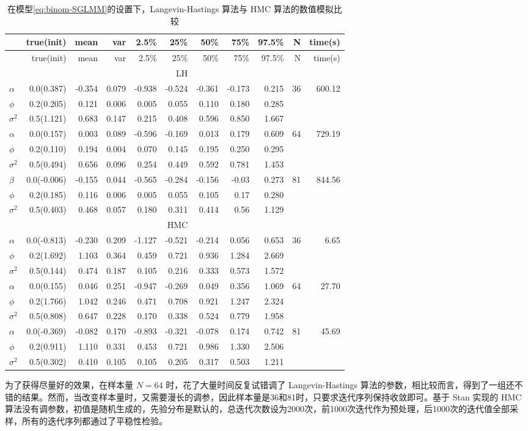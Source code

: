 \documentclass[12pt,a4paper,UTF8,twoside]{book}
\theoremstyle{definition}
\theoremstyle{definition}
\theoremstyle{definition}
\theoremstyle{remark}
\begin{document}
\begin{longtable}[]{@{}lrrrrrrrrrr@{}}
\caption{\label{tab:MCLH-vs-NUTS}
在模型\eqref{eq:binom-SGLMM}的设置下，Langevin-Hastings 算法与 HMC
算法的数值模拟比较}\tabularnewline
\toprule
& true(init) & mean & var & 2.5\% & 25\% & 50\% & 75\% & 97.5\% & N &
time(s)\tabularnewline
\midrule
\endfirsthead
\toprule
& true(init) & mean & var & 2.5\% & 25\% & 50\% & 75\% & 97.5\% & N &
time(s)\tabularnewline
\midrule
\endhead
& & & & & LH & & & & &\tabularnewline
\(\alpha\) & 0.0(0.387) & -0.354 & 0.079 & -0.938 & -0.524 & -0.361 &
-0.173 & 0.215 & 36 & 600.12\tabularnewline
\(\phi\) & 0.2(0.205) & 0.121 & 0.006 & 0.005 & 0.055 & 0.110 & 0.180 &
0.285 & &\tabularnewline
\(\sigma^2\) & 0.5(1.121) & 0.683 & 0.147 & 0.215 & 0.408 & 0.596 &
0.850 & 1.667 & &\tabularnewline
\(\alpha\) & 0.0(0.157) & 0.003 & 0.089 & -0.596 & -0.169 & 0.013 &
0.179 & 0.609 & 64 & 729.19\tabularnewline
\(\phi\) & 0.2(0.110) & 0.194 & 0.004 & 0.070 & 0.145 & 0.195 & 0.250 &
0.295 & &\tabularnewline
\(\sigma^2\) & 0.5(0.494) & 0.656 & 0.096 & 0.254 & 0.449 & 0.592 &
0.781 & 1.453 & &\tabularnewline
\(\beta\) & 0.0(-0.006) & -0.155 & 0.044 & -0.565 & -0.284 & -0.156 &
-0.03 & 0.273 & 81 & 844.56\tabularnewline
\(\phi\) & 0.2(0.185) & 0.116 & 0.006 & 0.005 & 0.055 & 0.105 & 0.17 &
0.280 & &\tabularnewline
\(\sigma^2\) & 0.5(0.403) & 0.468 & 0.057 & 0.180 & 0.311 & 0.414 & 0.56
& 1.129 & &\tabularnewline
& & & & & HMC & & & & &\tabularnewline
\(\alpha\) & 0.0(-0.813) & -0.230 & 0.209 & -1.127 & -0.521 & -0.214 &
0.056 & 0.653 & 36 & 6.65\tabularnewline
\(\phi\) & 0.2(1.692) & 1.103 & 0.364 & 0.459 & 0.721 & 0.936 & 1.284 &
2.669 & &\tabularnewline
\(\sigma^2\) & 0.5(0.144) & 0.474 & 0.187 & 0.105 & 0.216 & 0.333 &
0.573 & 1.572 & &\tabularnewline
\(\alpha\) & 0.0(0.155) & 0.046 & 0.251 & -0.947 & -0.269 & 0.049 &
0.356 & 1.069 & 64 & 27.70\tabularnewline
\(\phi\) & 0.2(1.766) & 1.042 & 0.246 & 0.471 & 0.708 & 0.921 & 1.247 &
2.324 & &\tabularnewline
\(\sigma^2\) & 0.5(0.808) & 0.647 & 0.228 & 0.170 & 0.338 & 0.524 &
0.779 & 1.958 & &\tabularnewline
\(\alpha\) & 0.0(-0.369) & -0.082 & 0.170 & -0.893 & -0.321 & -0.078 &
0.174 & 0.742 & 81 & 45.69\tabularnewline
\(\phi\) & 0.2(0.911) & 1.110 & 0.331 & 0.453 & 0.721 & 0.986 & 1.330 &
2.506 & &\tabularnewline
\(\sigma^2\) & 0.5(0.302) & 0.410 & 0.105 & 0.105 & 0.205 & 0.317 &
0.503 & 1.211 & &\tabularnewline
\bottomrule
\end{longtable}

为了获得尽量好的效果，在样本量 \(N = 64\) 时，花了大量时间反复试错调了
Langevin-Hastings
算法的参数，相比较而言，得到了一组还不错的结果。然而，当改变样本量时，又需要漫长的调参，因此样本量是36和81时，只要求迭代序列保持收敛即可。基于
Stan 实现的 HMC
算法没有调参数，初值是随机生成的，先验分布是默认的，总迭代次数设为2000次，前1000次迭代作为预处理，后1000次的迭代值全部采样，所有的迭代序列都通过了平稳性检验。
\end{document}
